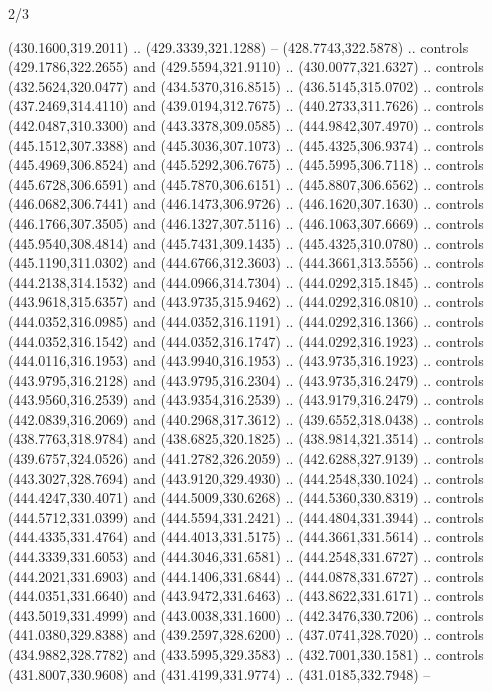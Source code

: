 \begin{flagdescription}{2/3}
\begin{scope}[xshift=0.5\flaglength,yshift=0.5\flagwidth,scale=\flagwidth/495.65]
\begin{scope}[y=0.8pt, x=0.8pt, yscale=-1,shift={(-463.76,-309.78)}]
  (430.1600,319.2011) .. (429.3339,321.1288) -- (428.7743,322.5878) .. controls
  (429.1786,322.2655) and (429.5594,321.9110) .. (430.0077,321.6327) .. controls
  (432.5624,320.0477) and (434.5370,316.8515) .. (436.5145,315.0702) .. controls
  (437.2469,314.4110) and (439.0194,312.7675) .. (440.2733,311.7626) .. controls
  (442.0487,310.3300) and (443.3378,309.0585) .. (444.9842,307.4970) .. controls
  (445.1512,307.3388) and (445.3036,307.1073) .. (445.4325,306.9374) .. controls
  (445.4969,306.8524) and (445.5292,306.7675) .. (445.5995,306.7118) .. controls
  (445.6728,306.6591) and (445.7870,306.6151) .. (445.8807,306.6562) .. controls
  (446.0682,306.7441) and (446.1473,306.9726) .. (446.1620,307.1630) .. controls
  (446.1766,307.3505) and (446.1327,307.5116) .. (446.1063,307.6669) .. controls
  (445.9540,308.4814) and (445.7431,309.1435) .. (445.4325,310.0780) .. controls
  (445.1190,311.0302) and (444.6766,312.3603) .. (444.3661,313.5556) .. controls
  (444.2138,314.1532) and (444.0966,314.7304) .. (444.0292,315.1845) .. controls
  (443.9618,315.6357) and (443.9735,315.9462) .. (444.0292,316.0810) .. controls
  (444.0352,316.0985) and (444.0352,316.1191) .. (444.0292,316.1366) .. controls
  (444.0352,316.1542) and (444.0352,316.1747) .. (444.0292,316.1923) .. controls
  (444.0116,316.1953) and (443.9940,316.1953) .. (443.9735,316.1923) .. controls
  (443.9795,316.2128) and (443.9795,316.2304) .. (443.9735,316.2479) .. controls
  (443.9560,316.2539) and (443.9354,316.2539) .. (443.9179,316.2479) .. controls
  (442.0839,316.2069) and (440.2968,317.3612) .. (439.6552,318.0438) .. controls
  (438.7763,318.9784) and (438.6825,320.1825) .. (438.9814,321.3514) .. controls
  (439.6757,324.0526) and (441.2782,326.2059) .. (442.6288,327.9139) .. controls
  (443.3027,328.7694) and (443.9120,329.4930) .. (444.2548,330.1024) .. controls
  (444.4247,330.4071) and (444.5009,330.6268) .. (444.5360,330.8319) .. controls
  (444.5712,331.0399) and (444.5594,331.2421) .. (444.4804,331.3944) .. controls
  (444.4335,331.4764) and (444.4013,331.5175) .. (444.3661,331.5614) .. controls
  (444.3339,331.6053) and (444.3046,331.6581) .. (444.2548,331.6727) .. controls
  (444.2021,331.6903) and (444.1406,331.6844) .. (444.0878,331.6727) .. controls
  (444.0351,331.6640) and (443.9472,331.6463) .. (443.8622,331.6171) .. controls
  (443.5019,331.4999) and (443.0038,331.1600) .. (442.3476,330.7206) .. controls
  (441.0380,329.8388) and (439.2597,328.6200) .. (437.0741,328.7020) .. controls
  (434.9882,328.7782) and (433.5995,329.3583) .. (432.7001,330.1581) .. controls
  (431.8007,330.9608) and (431.4199,331.9774) .. (431.0185,332.7948) --

\end{scope}
\end{scope}
\end{flagdescription}
